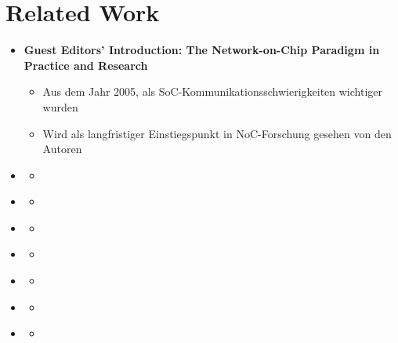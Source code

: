 \documentclass[
	paper=a4,
	fontsize=11pt,
	parskip=full %
]{scrreprt}
\begin{document}
    \chapter{Related Work} %
    \begin{itemize}
        \item \textbf{Guest Editors’ Introduction: The Network-on-Chip Paradigm in Practice and Research}
            \begin{itemize}
                \item Aus dem Jahr 2005, als SoC-Kommunikationsschwierigkeiten wichtiger wurden
                \item Wird als langfristiger Einstiegspunkt in NoC-Forschung gesehen von den Autoren
            \end{itemize}
        \item \textbf{}
            \begin{itemize}
                \item
            \end{itemize}
        \item \textbf{}
            \begin{itemize}
                \item
            \end{itemize}
        \item \textbf{}
            \begin{itemize}
                \item
            \end{itemize}
        \item \textbf{}
            \begin{itemize}
                \item
            \end{itemize}
        \item \textbf{}
            \begin{itemize}
                \item
            \end{itemize}
        \item \textbf{}
            \begin{itemize}
                \item
            \end{itemize}
        \item \textbf{}
            \begin{itemize}
                \item
            \end{itemize}
    \end{itemize}
\end{document}
